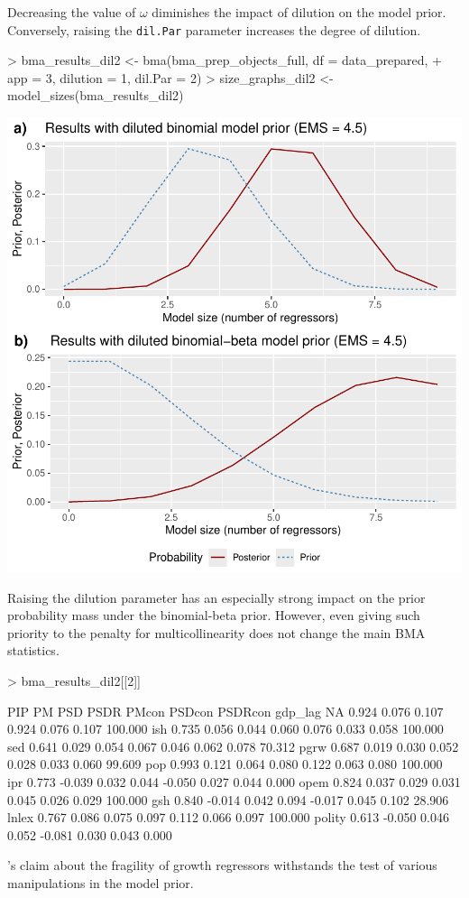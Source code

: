 \documentclass[a4paper]{article}
\begin{document}
Decreasing the value of $\omega$ diminishes the impact of dilution on the model prior.
Conversely, raising the \verb+dil.Par+ parameter increases the degree of dilution.
\begin{Schunk}
\begin{Sinput}
> bma_results_dil2 <- bma(bma_prep_objects_full, df = data_prepared,
+                        app = 3, dilution = 1, dil.Par = 2)
> size_graphs_dil2 <- model_sizes(bma_results_dil2)
\end{Sinput}
\end{Schunk}
\includegraphics{bdsm_vignette-042}

Raising the dilution parameter has an especially strong impact on the prior probability mass under the binomial-beta prior.
However, even giving such priority to the penalty for multicollinearity does not change the main BMA statistics.
\begin{Schunk}
\begin{Sinput}
> bma_results_dil2[[2]]
\end{Sinput}
\begin{Soutput}
          PIP     PM   PSD  PSDR  PMcon PSDcon PSDRcon    %
gdp_lag    NA  0.924 0.076 0.107  0.924  0.076   0.107 100.000
ish     0.735  0.056 0.044 0.060  0.076  0.033   0.058 100.000
sed     0.641  0.029 0.054 0.067  0.046  0.062   0.078  70.312
pgrw    0.687  0.019 0.030 0.052  0.028  0.033   0.060  99.609
pop     0.993  0.121 0.064 0.080  0.122  0.063   0.080 100.000
ipr     0.773 -0.039 0.032 0.044 -0.050  0.027   0.044   0.000
opem    0.824  0.037 0.029 0.031  0.045  0.026   0.029 100.000
gsh     0.840 -0.014 0.042 0.094 -0.017  0.045   0.102  28.906
lnlex   0.767  0.086 0.075 0.097  0.112  0.066   0.097 100.000
polity  0.613 -0.050 0.046 0.052 -0.081  0.030   0.043   0.000
\end{Soutput}
\end{Schunk}
\citet{Moral+2016}’s claim about the fragility of growth regressors withstands the test of various manipulations in the model prior.
\end{document}
